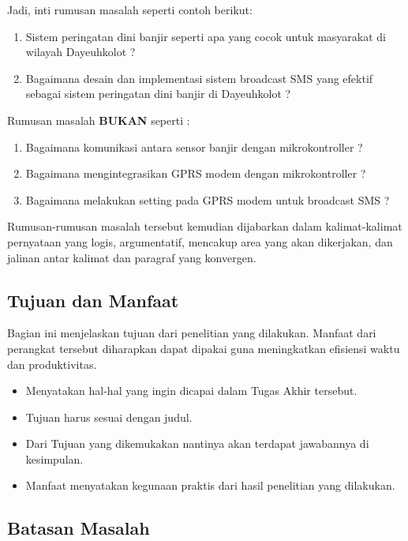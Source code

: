 \documentclass{final_project}
\begin{document}
Jadi, inti rumusan masalah seperti contoh berikut:
\begin{enumerate}
   \item Sistem peringatan dini banjir seperti apa yang cocok untuk masyarakat di wilayah Dayeuhkolot ? 
   \item Bagaimana desain dan implementasi sistem broadcast SMS yang efektif sebagai sistem peringatan dini banjir di Dayeuhkolot ?
\end{enumerate} 

Rumusan masalah \textbf{BUKAN} seperti :
\begin{enumerate}
   \item Bagaimana komunikasi antara sensor banjir dengan mikrokontroller ?
   \item Bagaimana mengintegrasikan GPRS modem dengan mikrokontroller ?
   \item Bagaimana melakukan setting pada GPRS modem untuk broadcast SMS ?
\end{enumerate}

Rumusan-rumusan masalah tersebut kemudian dijabarkan dalam kalimat-kalimat pernyataan yang logis, argumentatif, mencakup area yang akan dikerjakan, dan jalinan antar kalimat dan paragraf yang konvergen.

\subsection{Tujuan dan Manfaat}

Bagian ini menjelaskan tujuan dari penelitian yang dilakukan. Manfaat dari perangkat tersebut diharapkan dapat dipakai guna meningkatkan efisiensi waktu dan produktivitas.

\renewcommand{\labelitemi}{\textbullet}
\begin{itemize}
    \item Menyatakan hal-hal yang ingin dicapai dalam Tugas Akhir tersebut.
    \item Tujuan harus sesuai dengan judul.
    \item Dari Tujuan yang dikemukakan nantinya akan terdapat jawabannya di kesimpulan.
    \item Manfaat menyatakan kegunaan praktis dari hasil penelitian yang dilakukan.
\end{itemize}

\subsection{Batasan Masalah}
\end{document}

